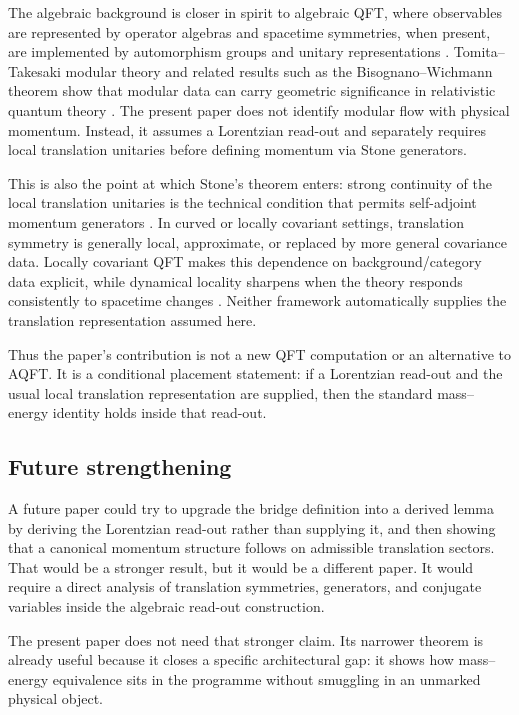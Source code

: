 \documentclass[12pt,a4paper]{article}
\theoremstyle{definition}
\theoremstyle{remark}
\begin{document}
The algebraic background is closer in spirit to algebraic QFT, where observables are represented by operator algebras and spacetime symmetries, when present, are implemented by automorphism groups and unitary representations \cite{Haag1996}. Tomita--Takesaki modular theory and related results such as the Bisognano--Wichmann theorem show that modular data can carry geometric significance in relativistic quantum theory \cite{Takesaki2003,BisognanoWichmann1975,Witten2018}. The present paper does not identify modular flow with physical momentum. Instead, it assumes a Lorentzian read-out and separately requires local translation unitaries before defining momentum via Stone generators.

This is also the point at which Stone's theorem enters: strong continuity of the local translation unitaries is the technical condition that permits self-adjoint momentum generators \cite{Stone1932,ReedSimon1972}. In curved or locally covariant settings, translation symmetry is generally local, approximate, or replaced by more general covariance data.  Locally covariant QFT makes this dependence on background/category data explicit, while dynamical locality sharpens when the theory responds consistently to spacetime changes \cite{BrunettiFredenhagenVerch2003,FewsterVerch2012}.  Neither framework automatically supplies the translation representation assumed here.

Thus the paper's contribution is not a new QFT computation or an alternative to AQFT. It is a conditional placement statement: if a Lorentzian read-out and the usual local translation representation are supplied, then the standard mass--energy identity holds inside that read-out.

\subsection{Future strengthening}

A future paper could try to upgrade the bridge definition into a derived lemma by deriving the Lorentzian read-out rather than supplying it, and then showing that a canonical momentum structure follows on admissible translation sectors. That would be a stronger result, but it would be a different paper. It would require a direct analysis of translation symmetries, generators, and conjugate variables inside the algebraic read-out construction.

The present paper does not need that stronger claim. Its narrower theorem is already useful because it closes a specific architectural gap: it shows how mass--energy equivalence sits in the programme without smuggling in an unmarked physical object.
\end{document}
